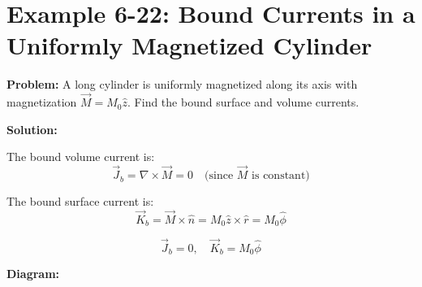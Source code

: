 \documentclass[12pt]{article}
\begin{document}
\section*{Example 6-22: Bound Currents in a Uniformly Magnetized Cylinder}

\textbf{Problem:}  
A long cylinder is uniformly magnetized along its axis with magnetization \( \vec{M} = M_0 \hat{z} \). Find the bound surface and volume currents.

\textbf{Solution:}

The bound volume current is:
\[
\vec{J}_b = \nabla \times \vec{M} = 0 \quad \text{(since } \vec{M} \text{ is constant)}
\]

The bound surface current is:
\[
\vec{K}_b = \vec{M} \times \hat{n} = M_0 \hat{z} \times \hat{r} = M_0 \hat{\phi}
\]

\begin{tcolorbox}
\[
\boxed{\vec{J}_b = 0}, \quad \boxed{\vec{K}_b = M_0 \hat{\phi}}
\]
\end{tcolorbox}

\textbf{Diagram:}
\begin{center}
\end{center}
\end{document}
